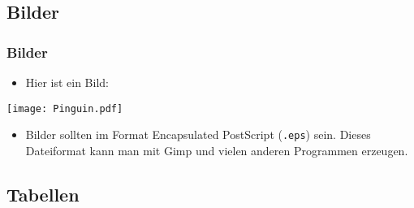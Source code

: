 \subsection{Bilder}


\begin{frame}
	\frametitle{Bilder}
	\begin{itemize}
		\item Hier ist ein Bild:
	\end{itemize}
	\begin{center}
		\texttt{[image: Pinguin.pdf]}
	\end{center}
	\begin{itemize}
		\item Bilder sollten im Format Encapsulated PostScript (\texttt{.eps}) sein. Dieses Dateiformat kann man mit Gimp und vielen anderen Programmen erzeugen.
	\end{itemize}
\end{frame}


\subsection{Tabellen}


